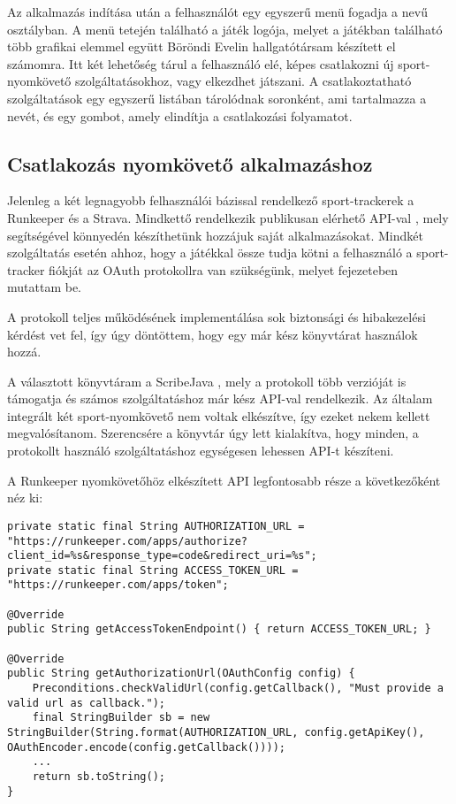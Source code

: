 Az alkalmazás indítása után a felhasználót egy egyszerű menü fogadja a  nevű osztályban. 
A menü tetején található a játék logója, melyet a játékban található több grafikai elemmel együtt Böröndi Evelin hallgatótársam készített el számomra. 
Itt két lehetőség tárul a felhasználó elé, képes csatlakozni új sport-nyomkövető szolgáltatásokhoz, vagy elkezdhet játszani. 
A csatlakoztatható szolgáltatások egy egyszerű listában tárolódnak soronként, ami tartalmazza a nevét, és egy gombot, amely elindítja a csatlakozási folyamatot. 

\subsection*{Csatlakozás nyomkövető alkalmazáshoz}
\label{trackerconnect}
Jelenleg a két legnagyobb felhasználói bázissal rendelkező sport-trackerek a Runkeeper és a Strava. 
Mindkettő rendelkezik publikusan elérhető API-val \cite{runkeeperapi} \cite{stravaapi}, mely segítségével könnyedén készíthetünk hozzájuk saját alkalmazásokat. 
Mindkét szolgáltatás esetén ahhoz, hogy a játékkal össze tudja kötni a felhasználó a sport-tracker fiókját az OAuth protokollra van szükségünk, melyet  fejezeteben mutattam be. 

A protokoll teljes működésének implementálása sok biztonsági és hibakezelési kérdést vet fel, így úgy döntöttem, hogy egy már kész könyvtárat használok hozzá. 

A választott könyvtáram a ScribeJava \cite{scribejava}, mely a protokoll több verzióját is támogatja és számos szolgáltatáshoz már kész API-val rendelkezik. 
Az általam integrált két sport-nyomkövető nem voltak elkészítve, így ezeket nekem kellett megvalósítanom. 
Szerencsére a könyvtár úgy lett kialakítva, hogy minden, a protokollt használó szolgáltatáshoz egységesen lehessen API-t készíteni. 

A Runkeeper nyomkövetőhöz elkészített API legfontosabb része a következőként néz ki:

\begin{lstlisting}
private static final String AUTHORIZATION_URL = "https://runkeeper.com/apps/authorize?client_id=%s&response_type=code&redirect_uri=%s";
private static final String ACCESS_TOKEN_URL = "https://runkeeper.com/apps/token";

@Override
public String getAccessTokenEndpoint() { return ACCESS_TOKEN_URL; }

@Override
public String getAuthorizationUrl(OAuthConfig config) {
	Preconditions.checkValidUrl(config.getCallback(), "Must provide a valid url as callback.");
	final StringBuilder sb = new StringBuilder(String.format(AUTHORIZATION_URL, config.getApiKey(), OAuthEncoder.encode(config.getCallback())));
	...
	return sb.toString();
}
\end{lstlisting}

